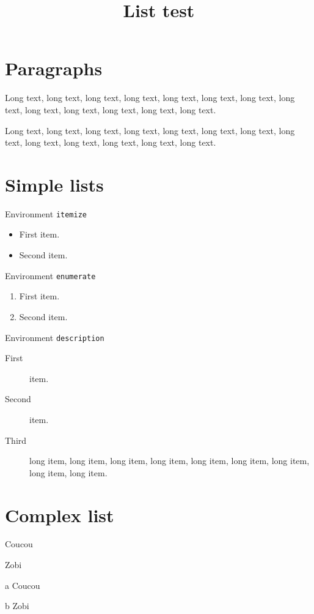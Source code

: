 \documentclass{article}
\title{List test}
\date{}
\newenvironment{list2}
{\begin{list}{}{\setlength{\itemsep}{0em}\setlength{\labelsep}{0em}%
      \renewcommand{\makelabel}[1]{\textbf{$\bullet$\ ##1}}}}
{\end{list}}%
\begin{document}
\maketitle
\section{Paragraphs}
Long text,
long text,
long text,
long text,
long text,
long text,
long text,
long text,
long text,
long text,
long text,
long text,
long text.

Long text,
long text,
long text,
long text,
long text,
long text,
long text,
long text,
long text,
long text,
long text,
long text,
long text.

\section{Simple lists}Environment \texttt{itemize}
\begin{itemize}
\item First item.
\item Second item.
\end{itemize}

Environment \texttt{enumerate}
\begin{enumerate}
\item First item.
\item Second item.
\end{enumerate}

Environment \texttt{description}
\begin{description}
\item[First] item.
\item[Second] item.
\item[Third] long item, long item, long item, long item, long item, long item, long item, long item, long item.
\end{description}

\section{Complex list}
\begin{list2}
\item Coucou
\item Zobi
\begin{list2}
\item[a] Coucou
\item[b] Zobi
\end{list2}
\end{list2}
\end{document}

